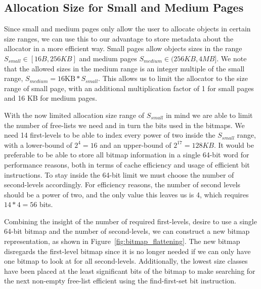 
\subsection{Allocation Size for Small and Medium Pages}

Since small and medium pages only allow the user to allocate objects in certain size ranges, we can use this to our advantage to store metadata about the allocator in a more efficient way. Small pages allow objects sizes in the range $S_{small} \in [16B, 256KB]$ and medium pages $S_{medium} \in (256KB, 4MB]$. We note that the allowed sizes in the medium range is an integer multiple of the small range, $S_{medium} = \text{16KB} * S_{small}$. This allows us to limit the allocator to the size range of small page, with an additional multiplication factor of 1 for small pages and 16 KB for medium pages.

With the now limited allocation size range of $S_{small}$ in mind we are able to limit the number of free-lists we need and in turn the bits used in the bitmaps. We need 14 first-levels to be able to index every power of two inside the $S_{small}$ range, with a lower-bound of $2^4 = 16$ and an upper-bound of $2^{17} = 128KB$. It would be preferable to be able to store all bitmap information in a single 64-bit word for performance reasons, both in terms of cache efficiency and usage of efficient bit instructions. To stay inside the 64-bit limit we must choose the number of second-levels accordingly. For efficiency reasons, the number of second levels should be a power of two, and the only value this leaves us is 4, which requires $14 * 4 = 56$ bits.

Combining the insight of the number of required first-levels, desire to use a single 64-bit bitmap and the number of second-levels, we can construct a new bitmap representation, as shown in Figure~\ref{fig:bitmap_flattening}. The new bitmap disregards the first-level bitmap since it is no longer needed if we can only have one bitmap to look at for all second-levels. Additionally, the lowest size classes have been placed at the least significant bits of the bitmap to make searching for the next non-empty free-list efficient using the find-first-set bit instruction.

